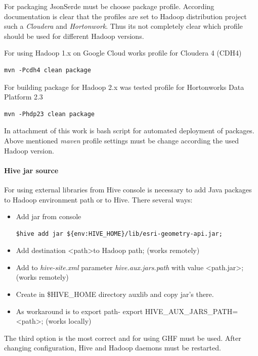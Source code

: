 \documentclass[a4paper,12pt,oneside]{report}
\begin{document}
For packaging JsonSerde 
must be choose package profile. According documentation is clear that the profiles are set to Hadoop distribution project such a \textit{Cloudera} and \textit{Hortonwork}. Thus its not completely clear which profile should be used for different Hadoop versions. 

For using Hadoop 1.x on Google Cloud works profile for Cloudera 4 (CDH4)
\begin{footnotesize}
\begin{lstlisting}[style=python]
mvn -Pcdh4 clean package
\end{lstlisting}
\end{footnotesize}
For building package for Hadoop 2.x was tested profile for Hortonworks Data Platform 2.3
\begin{footnotesize}
\begin{lstlisting}[style=python]
mvn -Phdp23 clean package
\end{lstlisting}
\end{footnotesize}

In attachment of this work is bash script for automated deployment of packages. Above mentioned \textit{maven} profile settings must be change according the used Hadoop version.

\paragraph{Hive jar source} For using external libraries from Hive console is necessary to add Java packages to Hadoop environment path or to Hive. There several ways:
\begin{itemize}
\item Add jar from console 
\begin{footnotesize}
\begin{lstlisting}[style=python]
$hive add jar ${env:HIVE_HOME}/lib/esri-geometry-api.jar;
\end{lstlisting}
\end{footnotesize}
\item Add destination \textless path\textgreater to Hadoop path; (works remotely)
\item Add to \textit{hive-site.xml} parameter \textit{hive.aux.jars.path} with value \textless path.jar\textgreater; (works remotely)
\item Create in \$HIVE\_HOME directory auxlib and copy jar's there.
\item As workaround is to export path-  export HIVE\_AUX\_JARS\_PATH= \textless path\textgreater; (works locally)
\end{itemize}
The third option is the most correct and for using GHF must be used. After changing configuration, Hive and Hadoop daemons must be restarted. 
\end{document}

